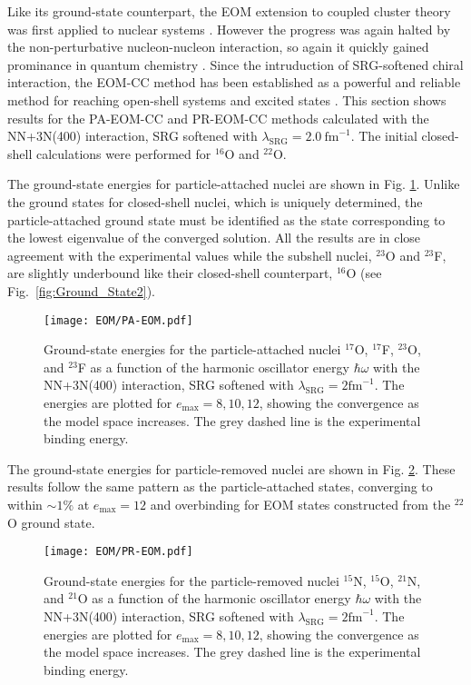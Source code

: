 \documentclass[thesis.tex]{subfiles}
\begin{document}
Like its ground-state counterpart, the EOM extension to coupled cluster theory was first applied to nuclear systems \cite{EMRICH1981379,EMRICH1981397,EMRICH1981439}.  However the progress was again halted by the non-perturbative nucleon-nucleon interaction, so again it quickly gained prominance in quantum chemistry \cite{STANTON1993,SHAVITT2009}.  Since the intruduction of SRG-softened chiral interaction, the EOM-CC method has been established as a powerful and reliable method for reaching open-shell systems and excited states \cite{WLOCH2005212501,GOUR2006024310,JANSEN2013,HAGEN2012,EKSTROM2015}.  This section shows results for the PA-EOM-CC and PR-EOM-CC methods calculated with the NN+3N(400) interaction, SRG softened with $\lambda_{\mathrm{SRG}}=2.0\ \mathrm{fm}^{-1}$.  The initial closed-shell calculations were performed for $^{16}$O and $^{22}$O.

The ground-state energies for particle-attached nuclei are shown in Fig. \ref{fig:PA-Nuclei}.  Unlike the ground states for closed-shell nuclei, which is uniquely determined, the particle-attached ground state must be identified as the state corresponding to the lowest eigenvalue of the converged solution.  All the results are in close agreement with the experimental values while the subshell nuclei, $^{23}$O and $^{23}$F, are slightly underbound like their closed-shell counterpart, $^{16}$O (see Fig.\ \ref{fig:Ground_State2}).
\begin{figure}[h]
  \centering
  \texttt{[image: EOM/PA-EOM.pdf]}
  \caption{Ground-state energies for the particle-attached nuclei $^{17}$O, $^{17}$F, $^{23}$O, and $^{23}$F as a function of the harmonic oscillator energy $\hbar\omega$ with the NN+3N(400) interaction, SRG softened with $\lambda_{\mathrm{SRG}}=2\mathrm{fm}^{-1}$.  The energies are plotted for $e_\mathrm{max}=8,10,12$, showing the convergence as the model space increases.  The grey dashed line is the experimental binding energy.}
  \label{fig:PA-Nuclei}
\end{figure}

The ground-state energies for particle-removed nuclei are shown in Fig. \ref{fig:PR-Nuclei}.  These results follow the same pattern as the particle-attached states, converging to within $\sim 1\%$ at $e_{\mathrm{max}}=12$ and overbinding for EOM states constructed from the $^{22}$O ground state.
\begin{figure}[h]
  \centering
  \texttt{[image: EOM/PR-EOM.pdf]}
  \caption{Ground-state energies for the particle-removed nuclei $^{15}$N, $^{15}$O, $^{21}$N, and $^{21}$O as a function of the harmonic oscillator energy $\hbar\omega$ with the NN+3N(400) interaction, SRG softened with $\lambda_{\mathrm{SRG}}=2\mathrm{fm}^{-1}$.  The energies are plotted for $e_\mathrm{max}=8,10,12$, showing the convergence as the model space increases.  The grey dashed line is the experimental binding energy.}
  \label{fig:PR-Nuclei}
\end{figure}
\end{document}
